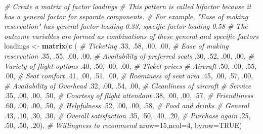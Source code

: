 \documentclass[12pt,]{krantz}
\makeatletter
\newenvironment{Shaded}{\begin{snugshade}}{\end{snugshade}}
\newcommand{\CommentTok}[1]{\textcolor[rgb]{0.37,0.37,0.37}{\textit{#1}}}
\newcommand{\DataTypeTok}[1]{\textcolor[rgb]{0.27,0.27,0.27}{#1}}
\newcommand{\DecValTok}[1]{\textcolor[rgb]{0.06,0.06,0.06}{#1}}
\newcommand{\FloatTok}[1]{\textcolor[rgb]{0.06,0.06,0.06}{#1}}
\newcommand{\KeywordTok}[1]{\textcolor[rgb]{0.27,0.27,0.27}{\textbf{#1}}}
\newcommand{\NormalTok}[1]{#1}
\newcommand{\OtherTok}[1]{\textcolor[rgb]{0.37,0.37,0.37}{#1}}
\newcommand{\StringTok}[1]{\textcolor[rgb]{0.5,0.5,0.5}{#1}}
\newenvironment{kframe}{%
\medskip{}
\setlength{\fboxsep}{.8em}
 \def\at@end@of@kframe{}%
 \ifinner\ifhmode%
  \def\at@end@of@kframe{\end{minipage}}%
  \begin{minipage}{\columnwidth}%
 \fi\fi%
 \def\FrameCommand##1{\hskip\@totalleftmargin \hskip-\fboxsep
 \colorbox{shadecolor}{##1}\hskip-\fboxsep
     \hskip-\linewidth \hskip-\@totalleftmargin \hskip\columnwidth}%
 \MakeFramed {\advance\hsize-\width
   \@totalleftmargin\z@ \linewidth\hsize
   \@setminipage}}%
 {\par\unskip\endMakeFramed%
 \at@end@of@kframe}
\renewenvironment{Shaded}{\begin{kframe}}{\end{kframe}}
\makeatother
\begin{document}
\begin{Shaded}
\begin{Highlighting}[]
\CommentTok{# Create a matrix of factor loadings}
\CommentTok{# This pattern is called bifactor because it has a general factor for separate components.}
\CommentTok{# For example, "Ease of making reservation" has general factor loading 0.33, specific factor loading 0.58}
\CommentTok{# The outcome variables are formed as combinations of these general and specific factors}
\NormalTok{loadings <-}\StringTok{ }\KeywordTok{matrix}\NormalTok{(}\KeywordTok{c}\NormalTok{ (}
  \CommentTok{# Ticketing}
  \FloatTok{.33}\NormalTok{, }\FloatTok{.58}\NormalTok{, }\FloatTok{.00}\NormalTok{, }\FloatTok{.00}\NormalTok{,  }\CommentTok{# Ease of making reservation }
  \FloatTok{.35}\NormalTok{, }\FloatTok{.55}\NormalTok{, }\FloatTok{.00}\NormalTok{, }\FloatTok{.00}\NormalTok{,  }\CommentTok{# Availability of preferred seats}
  \FloatTok{.30}\NormalTok{, }\FloatTok{.52}\NormalTok{, }\FloatTok{.00}\NormalTok{, }\FloatTok{.00}\NormalTok{,  }\CommentTok{# Variety of flight options}
  \FloatTok{.40}\NormalTok{, }\FloatTok{.50}\NormalTok{, }\FloatTok{.00}\NormalTok{, }\FloatTok{.00}\NormalTok{,  }\CommentTok{# Ticket prices}
  \CommentTok{# Aircraft}
  \FloatTok{.50}\NormalTok{, }\FloatTok{.00}\NormalTok{, }\FloatTok{.55}\NormalTok{, }\FloatTok{.00}\NormalTok{,  }\CommentTok{# Seat comfort}
  \FloatTok{.41}\NormalTok{, }\FloatTok{.00}\NormalTok{, }\FloatTok{.51}\NormalTok{, }\FloatTok{.00}\NormalTok{,  }\CommentTok{# Roominess of seat area}
  \FloatTok{.45}\NormalTok{, }\FloatTok{.00}\NormalTok{, }\FloatTok{.57}\NormalTok{, }\FloatTok{.00}\NormalTok{,  }\CommentTok{# Availability of Overhead}
  \FloatTok{.32}\NormalTok{, }\FloatTok{.00}\NormalTok{, }\FloatTok{.54}\NormalTok{, }\FloatTok{.00}\NormalTok{,  }\CommentTok{# Cleanliness of aircraft}
  \CommentTok{# Service}
  \FloatTok{.35}\NormalTok{, }\FloatTok{.00}\NormalTok{, }\FloatTok{.00}\NormalTok{, }\FloatTok{.50}\NormalTok{,  }\CommentTok{# Courtesy of flight attendant}
  \FloatTok{.38}\NormalTok{, }\FloatTok{.00}\NormalTok{, }\FloatTok{.00}\NormalTok{, }\FloatTok{.57}\NormalTok{,  }\CommentTok{# Friendliness}
  \FloatTok{.60}\NormalTok{, }\FloatTok{.00}\NormalTok{, }\FloatTok{.00}\NormalTok{, }\FloatTok{.50}\NormalTok{,  }\CommentTok{# Helpfulness}
  \FloatTok{.52}\NormalTok{, }\FloatTok{.00}\NormalTok{, }\FloatTok{.00}\NormalTok{, }\FloatTok{.58}\NormalTok{,  }\CommentTok{# Food and drinks}
  \CommentTok{# General   }
  \FloatTok{.43}\NormalTok{, }\FloatTok{.10}\NormalTok{, }\FloatTok{.30}\NormalTok{, }\FloatTok{.30}\NormalTok{,  }\CommentTok{# Overall satisfaction}
  \FloatTok{.35}\NormalTok{, }\FloatTok{.50}\NormalTok{, }\FloatTok{.40}\NormalTok{, }\FloatTok{.20}\NormalTok{,  }\CommentTok{# Purchase again}
  \FloatTok{.25}\NormalTok{, }\FloatTok{.50}\NormalTok{, }\FloatTok{.50}\NormalTok{, }\FloatTok{.20}\NormalTok{), }\CommentTok{# Willingness to recommend}
  \DataTypeTok{nrow=}\DecValTok{15}\NormalTok{,}\DataTypeTok{ncol=}\DecValTok{4}\NormalTok{, }\DataTypeTok{byrow=}\OtherTok{TRUE}\NormalTok{)}
  

\end{Highlighting}
\end{Shaded}
\end{document}
